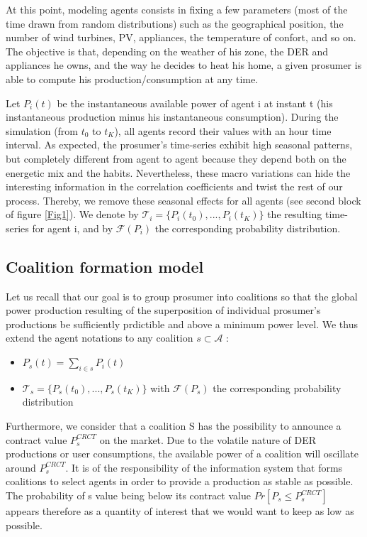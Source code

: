 \documentclass[conference]{IEEEtran}
\begin{document}
At this point, modeling agents consists in fixing a few parameters (most of the time drawn from random distributions) such as the geographical position, the number of wind turbines, PV, appliances, the temperature of confort, and so on. The objective is that, depending on the weather of his zone, the DER and appliances he owns, and the way he decides to heat his home, a given prosumer is able to compute his production/consumption at any time. 

Let $ P_{i}(t) $ be the instantaneous available power of agent i at instant t (his instantaneous production minus his instantaneous consumption). During the simulation (from $t_{0} $ to $ t_{K} $), all agents record their values with an hour time interval. As expected, the prosumer's time-series exhibit high seasonal patterns, but completely different from agent to agent because they depend both on the energetic mix and the habits. Nevertheless, these macro variations can hide the interesting information in the correlation coefficients and twist the rest of our process. Thereby, we remove these seasonal effects for all agents (see second block of figure \ref{Fig1}). We denote by $ \mathcal{T}_{i} = \{ P_{i}(t_{0}),...,P_{i}(t_{K}) \} $ the resulting time-series for  agent i, and by $ \mathcal{F}(P_{i}) $ the corresponding probability distribution.

\subsection{Coalition formation model}\label{subsec:Coalition}

Let us recall that our goal is to group prosumer into coalitions so that the global power production resulting of the superposition of individual prosumer's productions be sufficiently prdictible and above a minimum power level. We thus extend the agent notations to any coalition $ s \subset \mathcal{A} $ : 
\begin{itemize}
\item $ P_{s}(t) = \sum_{i \in s} P_{i}(t) $
\item $ \mathcal{T}_{s} = \{ P_{s}(t_{0}),...,P_{s}(t_{K}) \} $ with $ \mathcal{F}(P_{s}) $ the corresponding probability distribution
\end{itemize}

Furthermore, we consider that a coalition S has the possibility to announce a contract value $ P_{s}^{CRCT} $ on the market. Due to the volatile nature of DER productions or user consumptions, the available power of a coalition will oscillate around $ P_{s}^{CRCT} $. It is of the responsibility of the information system that forms coalitions to select agents in order to provide a production as stable as possible. The probability of s value being below its contract value $ Pr[P_{s} \leq P_{s}^{CRCT} ] $ appears therefore as a quantity of interest that we would want to keep as low as possible. 
\end{document}
